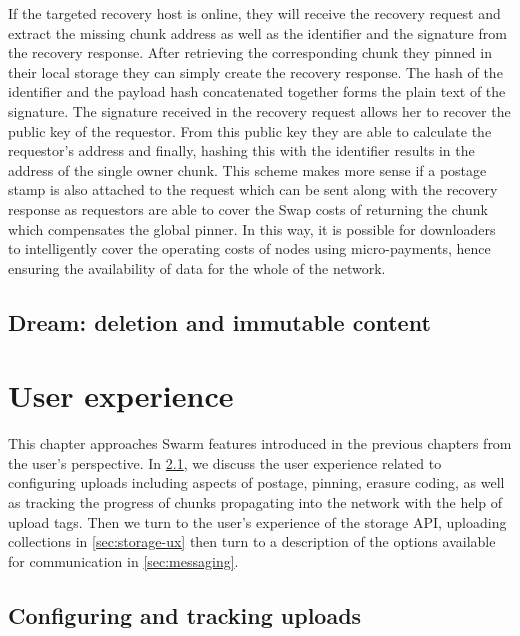 If the targeted recovery host is online, they will receive the recovery request and extract the missing chunk address as well as the identifier and the signature from the recovery response. After retrieving the corresponding chunk they pinned in their local storage they can simply create the recovery response. The hash of the identifier and the payload hash concatenated together forms the plain text of the signature. The signature received in the recovery request allows her to recover the public key of the requestor. From this public key they are able to calculate the requestor's address and finally, hashing this with the identifier results in the address of the single owner chunk. This scheme makes more sense if a postage stamp is also attached to the request which can be sent along with the recovery response as requestors are able to cover the Swap costs of returning the chunk which compensates the global pinner. In this way, it is possible for downloaders to intelligently cover the operating costs of nodes using micro-payments, hence ensuring the availability of data for the whole of the network.

\section{Dream: deletion and immutable content}\label{sec:dream}





\chapter{User experience}\label{sec:ux}

This chapter approaches Swarm features introduced in the previous chapters from the user's perspective. In \ref{sec:upload}, we discuss the user experience related to configuring uploads including aspects of postage, pinning, erasure coding, as well as tracking the progress of chunks propagating into the network with the help of upload tags. Then we turn to the user's experience of the storage API, uploading collections in \ref{sec:storage-ux} then turn to a description of the options available for communication in \ref{sec:messaging}.

\section{Configuring and tracking uploads \statusgreen}\label{sec:upload}

